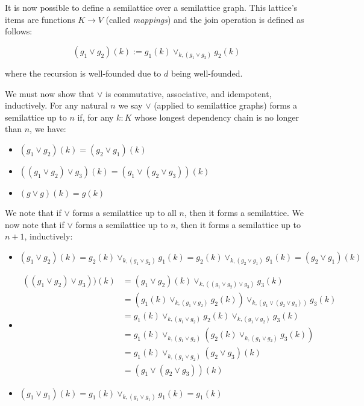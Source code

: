 \documentclass{article}
\begin{document}
        It is now possible to define a semilattice over a semilattice graph. This lattice's items are functions $K \rightarrow V$ (called \emph{mappings}) and the join operation is defined as follows:

        $$ (g_1 \vee g_2)(k) := g_1(k) \vee_{k, (g_1 \vee g_2)} g_2(k) $$

        where the recursion is well-founded due to $d$ being well-founded.

        We must now show that $\vee$ is commutative, associative, and idempotent, inductively. For any natural $n$ we say $\vee$ (applied to semilattice graphs) forms a semilattice up to $n$ if, for any $k : K$ whose longest dependency chain is no longer than $n$, we have:

        \begin{itemize}
          \item $(g_1 \vee g_2)(k) = (g_2 \vee g_1)(k)$
          \item $((g_1 \vee g_2) \vee g_3)(k) = (g_1 \vee (g_2 \vee g_3))(k)$
          \item $(g \vee g)(k) = g(k)$
        \end{itemize}

        We note that if $\vee$ forms a semilattice up to all $n$, then it forms a semilattice. We now note that if $\vee$ forms a semilattice up to $n$, then it forms a semilattice up to $n+1$, inductively:


        \begin{itemize}
          \item $(g_1 \vee g_2)(k) = g_2(k) \vee_{k, (g_1 \vee g_2)} g_1(k) = g_2(k) \vee_{k, (g_2 \vee g_1)} g_1(k) = (g_2 \vee g_1)(k)$
          \item
            \begin{align*}
              ((g_1 \vee g_2) \vee g_3))(k) &= (g_1 \vee g_2)(k) \vee_{k, ((g_1 \vee g_2) \vee g_3)} g_3(k) \\
              &= (g_1(k) \vee_{k, (g_1 \vee g_2)} g_2(k)) \vee_{k, (g_1 \vee (g_2 \vee g_3))} g_3(k) \\
              &= g_1(k) \vee_{k, (g_1 \vee g_2)} g_2(k) \vee_{k, (g_1 \vee g_2)} g_3(k) \\
              &= g_1(k) \vee_{k, (g_1 \vee g_2)} (g_2(k) \vee_{k, (g_1 \vee g_2)} g_3(k)) \\
              &= g_1(k) \vee_{k, (g_1 \vee g_2)} (g_2 \vee g_3)(k) \\
              &= (g_1 \vee (g_2 \vee g_3))(k)
            \end{align*}
          \item $(g_1 \vee g_1)(k) = g_1(k) \vee_{k, (g_1 \vee g_1)} g_1(k) = g_1(k)$
        \end{itemize}
\end{document}
